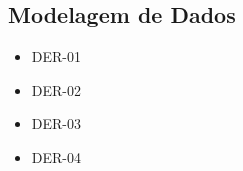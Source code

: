\subsection{Modelagem de Dados}

\begin{itemize}
  \item DER-01

  \item DER-02

  \item DER-03

  \item DER-04

\end{itemize}


